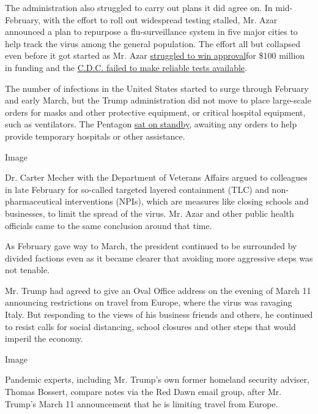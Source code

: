 The administration also struggled to carry out plans it did agree on. In
mid-February, with the effort to roll out widespread testing stalled,
Mr. Azar announced a plan to repurpose a flu-surveillance system in five
major cities to help track the virus among the general population. The
effort all but collapsed even before it got started as Mr. Azar
\href{https://int.graylady3jvrrxbe.onion/data/documenthelper/6873-2020-02-14-cdc-surveillance-fu/51b5187c0fd8b4698a50/optimized/full.pdf\#page=1}{struggled
to win approval}for \$100 million in funding and the
\href{https://www.nytimes3xbfgragh.onion/2020/03/10/us/coronavirus-testing-delays.html}{C.D.C.
failed to make reliable tests available}.

The number of infections in the United States started to surge through
February and early March, but the Trump administration did not move to
place large-scale orders for masks and other protective equipment, or
critical hospital equipment, such as ventilators. The Pentagon
\href{https://www.nytimes3xbfgragh.onion/2020/03/17/us/politics/coronavirus-government-army-corps.html}{sat
on standby}, awaiting any orders to help provide temporary hospitals or
other assistance.

Image

Dr. Carter Mecher with the Department of Veterans Affairs argued to
colleagues in late February for so-called targeted layered containment
(TLC) and non-pharmaceutical interventions (NPIs), which are measures
like closing schools and businesses, to limit the spread of the virus.
Mr. Azar and other public health officials came to the same conclusion
around that time.

As February gave way to March, the president continued to be surrounded
by divided factions even as it became clearer that avoiding more
aggressive steps was not tenable.

Mr. Trump had agreed to give an Oval Office address on the evening of
March 11 announcing restrictions on travel from Europe, where the virus
was ravaging Italy. But responding to the views of his business friends
and others, he continued to resist calls for social distancing, school
closures and other steps that would imperil the economy.

Image

Pandemic experts, including Mr. Trump's own former homeland security
adviser, Thomas Bossert, compare notes via the Red Dawn email group,
after Mr. Trump's March 11 announcement that he is limiting travel from
Europe.

